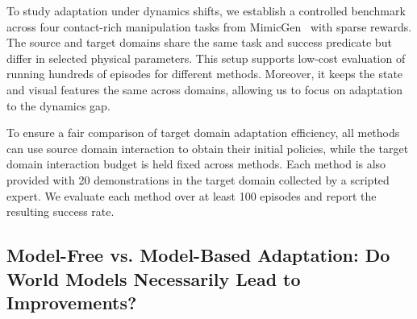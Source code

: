 \documentclass{article} %
\begin{document}
To study adaptation under dynamics shifts, we establish a controlled benchmark across four contact-rich manipulation tasks from MimicGen~\citep{pmlr-v229-mandlekar23a} with sparse rewards. The source and target domains share the same task and success predicate but differ in selected physical parameters. This setup supports low-cost evaluation of running hundreds of episodes for different methods. Moreover, it keeps the state and visual features the same across domains, allowing us to focus on adaptation to the dynamics gap.

To ensure a fair comparison of target domain adaptation efficiency, all methods can use source domain interaction to obtain their initial policies, while the target domain interaction budget is held fixed across methods. Each method is also provided with 20 demonstrations in the target domain collected by a scripted expert. We evaluate each method over at least 100 episodes and report the resulting success rate.

\subsection{Model-Free vs. Model-Based Adaptation: Do World Models Necessarily Lead to Improvements?}
\label{sec:mf-vs-mb}
\end{document}

